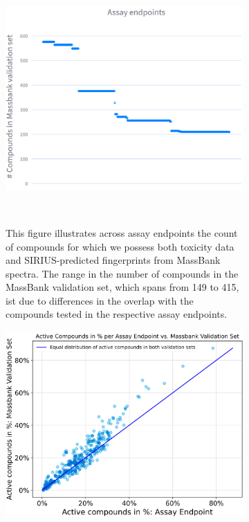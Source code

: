 \begin{enumerate}
    
    \begin{figure}[h]
        \centering
        \begin{subfigure}[b]{0.48\textwidth}
            \centering
            \includegraphics[width=\textwidth]{figures/Massbank_overlap.png}
            \caption{This figure illustrates across assay endpoints the count of compounds for which we possess both toxicity data and SIRIUS-predicted fingerprints from MassBank spectra. The range in the number of compounds in the MassBank validation set, which spans from 149 to 415, ist due to differences in the overlap with the compounds tested in the respective assay endpoints.}
        ~\label{fig:MassBank_overlap}
        \end{subfigure}
        \hfill
        \begin{subfigure}[b]{0.48\textwidth}
            \centering
            \includegraphics[width=\textwidth]{figures/activity_ratio_comparison.png}

\end{subfigure}
\end{figure}
\end{enumerate}
